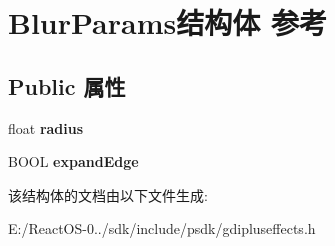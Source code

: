 \hypertarget{struct_blur_params}{}\section{Blur\+Params结构体 参考}
\label{struct_blur_params}
\subsection*{Public 属性}
\begin{DoxyCompactItemize}
\item 
\mbox{\label{struct_blur_params_aff11405f41d79a41a2ab0a80b1c1c55e}} 
float {\bfseries radius}
\item 
\mbox{\label{struct_blur_params_a9438648e850c5ed261ae378e4cff24d4}} 
B\+O\+OL {\bfseries expand\+Edge}
\end{DoxyCompactItemize}


该结构体的文档由以下文件生成\+:\begin{DoxyCompactItemize}
\item 
E\+:/\+React\+O\+S-\/0../sdk/include/psdk/gdipluseffects.\+h\end{DoxyCompactItemize}
